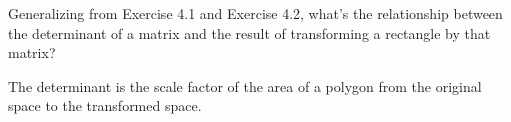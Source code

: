 Generalizing from Exercise 4.1 and Exercise 4.2, what’s the relationship between the determinant of a matrix and the result of transforming a rectangle by that matrix?

\begin{solution}
The determinant is the scale factor of the area of a polygon from the original space to the transformed space.
\end{solution}